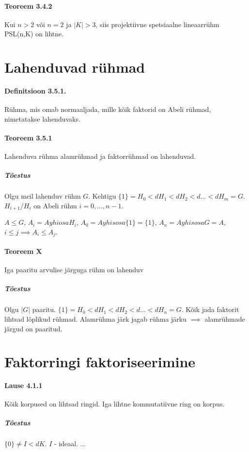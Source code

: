 \documentclass[12pt]{report}
\numberwithin{equation}{section}
\theoremstyle{definition}
\theoremstyle{plain}
\begin{document}
\paragraph{Teoreem 3.4.2} Kui $n > 2$ või $n=2$ ja $|K| > 3$, siis projektiivne spetsiaalne lineaarr\"uhm PSL(n,K) on lihtne. 

\section{Lahenduvad rühmad}

\paragraph{Definitsioon 3.5.1.} R\"uhma, mis omab normaaljada, mille kõik faktorid on Abeli rühmad, nimetatakse lahenduvaks.

\paragraph{Teoreem 3.5.1} Lahenduva r\"uhma alamrühmad ja faktorrühmad on lahenduvad.

\subparagraph{Tõestus} Olgu meil lahenduv rühm $G$. Kehtigu $\{1\} = H_0 <d H_1 <d H_2 <d ... <d H_m = G$. $H_{i+1}/H_i $ on Abeli rühm $i=0,...,n-1$. 

$A \leq G $, $ A_i = A yhiosa H_i$, $A_0 = A yhisosa \{1\} = \{1\}$, $A_n = A yhisosa G = A$, $i \leq j \implies A_i \leq A_j$. 

\paragraph{Teoreem X} Iga paaritu arvulise järguga rühm on lahenduv

\subparagraph{Tõestus}
Olgu $|G|$ paaritu. $\{1\} = H_0 <d H_1 <d H_2 <d ... <d H_n = G$. Kõik jada faktorit lihtsad lõplikud rühmad. Alamrühma järk jagab rühma järku $\implies$ alamr\"uhmade järgud on paaritud. 

\section{Faktorringi faktoriseerimine}

\paragraph{Lause 4.1.1} Kõik korpused on lihtsad ringid. Iga lihtne kommutatiivne ring on korpus. 

\subparagraph{Tõestus} $\{0\} \neq I <d K$. $I$ - ideaal. ...
\end{document}
